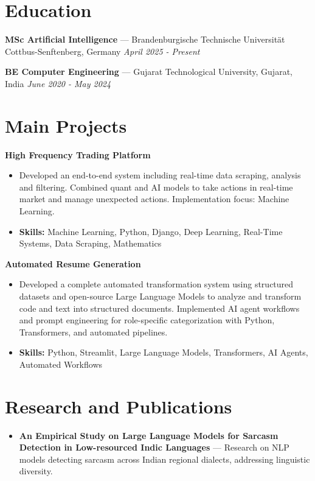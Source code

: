 \documentclass[a4paper,10pt]{article}
\begin{document}
\section*{Education}
\textbf{MSc Artificial Intelligence} — Brandenburgische Technische Universität Cottbus-Senftenberg, Germany \hfill \textit{April 2025 - Present}\par
\vspace{1.5pt}
\textbf{BE Computer Engineering} — Gujarat Technological University, Gujarat, India \hfill \textit{June 2020 - May 2024}\par

\section*{Main Projects}
\textbf{High Frequency Trading Platform}\par
\vspace{1pt}
\begin{itemize}
  \item Developed an end-to-end system including real-time data scraping, analysis and filtering. Combined quant and AI models to take actions in real-time market and manage unexpected actions. Implementation focus: Machine Learning.
  \item \textbf{Skills:} Machine Learning, Python, Django, Deep Learning, Real-Time Systems, Data Scraping, Mathematics
\end{itemize}
\vspace{3pt}
\textbf{Automated Resume Generation}\par
\vspace{1pt}
\begin{itemize}
  \item Developed a complete automated transformation system using structured datasets and open-source Large Language Models to analyze and transform code and text into structured documents. Implemented AI agent workflows and prompt engineering for role-specific categorization with Python, Transformers, and automated pipelines.
  \item \textbf{Skills:} Python, Streamlit, Large Language Models, Transformers, AI Agents, Automated Workflows
\end{itemize}

\section*{Research and Publications}
\begin{itemize}
\item \textbf{An Empirical Study on Large Language Models for Sarcasm Detection in Low-resourced Indic Languages} — Research on NLP models detecting sarcasm across Indian regional dialects, addressing linguistic diversity.
\end{itemize}
\end{document}
